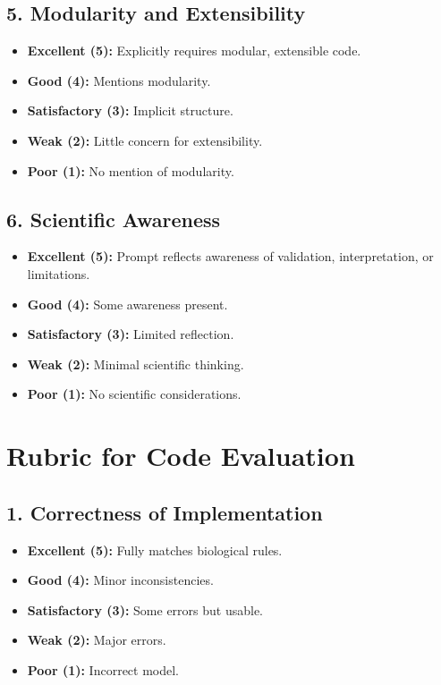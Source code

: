 \documentclass[paper=letter, fontsize=12pt]{article}
\numberwithin{equation}{section}
\begin{document}
\subsection*{5. Modularity and Extensibility}

\begin{itemize}
\item \textbf{Excellent (5):} Explicitly requires modular, extensible code.
\item \textbf{Good (4):} Mentions modularity.
\item \textbf{Satisfactory (3):} Implicit structure.
\item \textbf{Weak (2):} Little concern for extensibility.
\item \textbf{Poor (1):} No mention of modularity.
\end{itemize}

\subsection*{6. Scientific Awareness}

\begin{itemize}
\item \textbf{Excellent (5):} Prompt reflects awareness of validation, interpretation, or limitations.
\item \textbf{Good (4):} Some awareness present.
\item \textbf{Satisfactory (3):} Limited reflection.
\item \textbf{Weak (2):} Minimal scientific thinking.
\item \textbf{Poor (1):} No scientific considerations.
\end{itemize}

\bigskip

\section*{Rubric for Code Evaluation}

\subsection*{1. Correctness of Implementation}

\begin{itemize}
\item \textbf{Excellent (5):} Fully matches biological rules.
\item \textbf{Good (4):} Minor inconsistencies.
\item \textbf{Satisfactory (3):} Some errors but usable.
\item \textbf{Weak (2):} Major errors.
\item \textbf{Poor (1):} Incorrect model.
\end{itemize}
\end{document}
